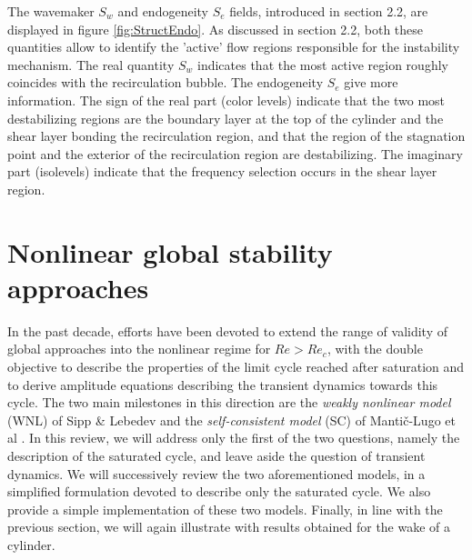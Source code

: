 \documentclass[twocolumn,10pt]{asme2ej}
\begin{document}
The wavemaker $S_w$ and endogeneity $S_e$ fields, introduced in section 2.2, are displayed in figure \ref{fig:StructEndo}. As discussed in section 2.2, both these quantities allow to identify the 'active' flow regions responsible for the instability mechanism. The real quantity $S_w$ indicates that the most active region  roughly coincides with the recirculation bubble. The endogeneity $S_e$ give more information. The sign of the real part (color levels)  indicate that the two most destabilizing regions are the boundary layer at the top of the cylinder and the shear layer bonding the recirculation region, and that the region of the stagnation point and the exterior of the recirculation region are destabilizing. The imaginary part (isolevels) indicate that the frequency selection occurs in the shear layer region.

\section{Nonlinear global stability approaches}
\vspace{.2cm}



In the past decade, efforts have been devoted to extend the range of validity of global approaches into the nonlinear regime for $Re>Re_c$, with the double objective to describe the properties of the limit cycle reached after saturation and to derive amplitude equations describing the transient dynamics towards this cycle. The two main milestones in this direction  are the {\em weakly nonlinear model}  (WNL) of Sipp \& Lebedev \cite{SippLebedev} and the {\em self-consistent model} (SC) of Manti\v{c}-Lugo et al \cite{MLugo2014}.
 In this review, we will address only the first of the two questions, namely  the description of the saturated cycle, and leave aside the question of transient dynamics. We will successively review the two aforementioned models, in a simplified formulation devoted to describe only the saturated cycle. We also provide a simple implementation of these two models. Finally, in line with the previous section, we will again illustrate with results obtained for the wake of a cylinder.
  
\end{document}
